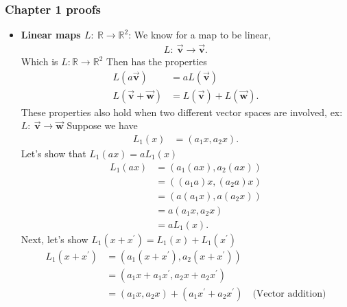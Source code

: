 \documentclass{report}
\begin{document}
    \pagebreak 
    \subsubsection{Chapter 1 proofs}
    \begin{itemize}
        \item \textbf{Linear maps $L:\ \mathbb{R} \to \mathbb{R}^{2}$}: 
            We know for a map to be linear,
            \begin{align*}
                L:\ \vec{\mathbf{v}} \to \vec{\mathbf{v}}
            .\end{align*}
            \bigbreak \noindent 
            Which is $L: \mathbb{R} \to \mathbb{R}^{2} $
            \bigbreak \noindent 
            Then has the properties
            \begin{align*}
                L(a\vec{\mathbf{v}}) &= aL(\vec{\mathbf{v}}) \\
                L(\vec{\mathbf{v}} + \vec{\mathbf{w}}) &= L(\vec{\mathbf{v}}) + L(\vec{\mathbf{w}})
            .\end{align*}
            These properties also hold when two different vector spaces are involved, ex: $L:\ \vec{\mathbf{v}} \to \vec{\mathbf{w}} $
            \bigbreak \noindent 
            Suppose we have
            \begin{align*}
                L_{1}(x) &= (a_{1}x, a_{2}x)
            .\end{align*}
            Let's show that $L_{1}(ax) = aL_{1}(x)$
            \begin{align*}
                L_{1}(ax) &= (a_{1}(ax), a_{2}(ax)) \\
                &=((a_{1}a)x, (a_{2}a)x) \\
                &=(a(a_{1}x), a(a_{2}x)) \\
                &=a(a_{1}x,a_{2}x) \\
                &=aL_{1}(x)
            .\end{align*}
            \bigbreak \noindent 
            Next, let's show $L_{1}(x + x^{\prime}) = L_{1}(x) + L_{1}(x^{\prime})$
            \begin{align*}
                L_{1}(x + x^{\prime}) &= (a_{1}(x+x^{\prime}), a_{2}(x + x^{\prime})) \\
                &=(a_{1}x + a_{1}x^{\prime}, a_{2}x + a_{2}x^{\prime}) \\
                &=(a_{1}x,a_{2}x) + (a_{1}x^{\prime} + a_{2}x^{\prime}) \quad \text{(Vector addition)} \\

\end{align*}
\end{itemize}
\end{document}
